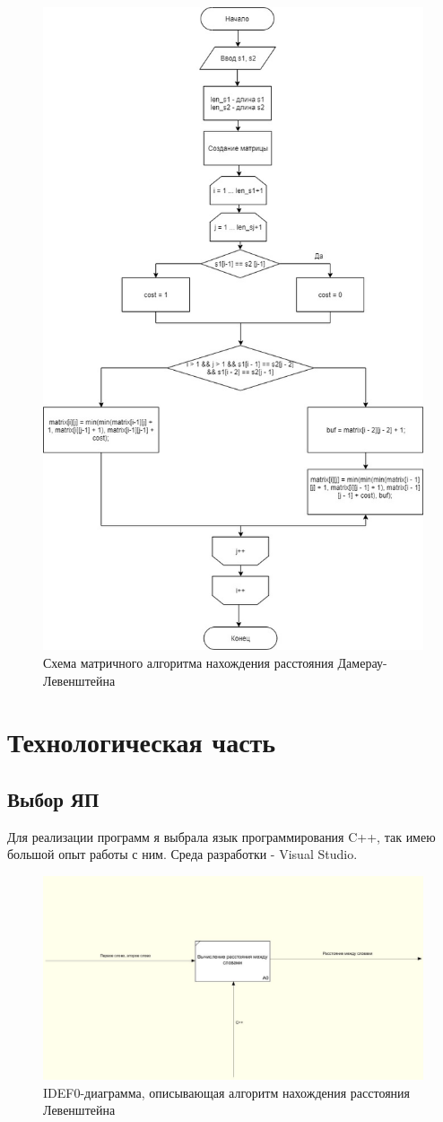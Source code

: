 \documentclass[12pt]{report}
\begin{document}
\begin{figure}[h]
\centering
\includegraphics[width=0.75\linewidth]{MatrixDL.jpg}
\caption{Схема матричного алгоритма нахождения расстояния Дамерау-Левенштейна}
\label{fig:mpr}
\end{figure}


\chapter{Технологическая часть}
\section{Выбор ЯП}
Для реализации программ я выбрала язык программирования C++, так имею большой опыт работы с ним. Среда разработки - Visual Studio.

\begin{figure}[h]
\centering
\includegraphics[width=1\linewidth]{idef.jpg}
\caption{IDEF0-диаграмма, описывающая алгоритм нахождения расстояния Левенштейна}
\label{fig:mpr}
\end{figure}
\end{document}
